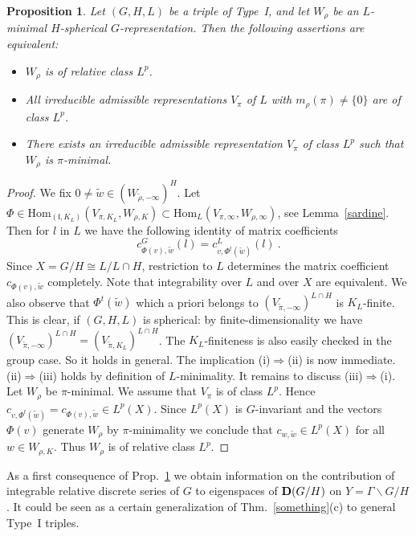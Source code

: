 \documentclass[10]{amsart}
\newtheorem{pro}[thm]{Proposition}
\theoremstyle{remark}
\theoremstyle{definition}
\numberwithin{equation}{section}
\newcommand{\Hom}{\mathrm{Hom}}
\newcommand{\fl}{{\mathfrak l}}
\newcommand{\be}{\begin{equation}}
\begin{document}
{\begin{pro}\label{fishy}
Let $(G,H,L)$ be a triple of Type~I, and let $W_\rho$ be an $L$-minimal  $H$-spherical $G$-representation. Then the following assertions are equivalent:
\begin{itemize}
\item[(i)] $W_\rho$ is of relative class $L^p$.
\item[(ii)] All irreducible admissible representations $V_\pi$ of $L$ with $m_\rho(\pi)\ne \{0\}$ are of class $L^p$.
\item[(iii)] There exists an irreducible admissible representation $V_\pi$ of class $L^p$ such that $W_\rho$ is $\pi$-minimal.
\end{itemize}
\end{pro}

\begin{proof}
We fix $0\ne\tilde w\in (W_{\tilde\rho,-\infty})^H$. Let $\Phi\in  \Hom_{(\fl,K_L)}(V_{\pi,K_L},W_{\rho,K})\subset  \Hom_{L}(V_{\pi,\infty},W_{\rho,\infty})$, see Lemma~\ref{sardine}.
Then for $l$ in $L$ we have the following identity of matrix coefficients
\be\label{dadamax} 
 c^G_{\Phi(v),\tilde w}(l)=c^L_{v,\Phi^t(\tilde w)}(l) \ .
\end{equation}
Since $X=G/H \cong L/L\cap H$, restriction to $L$ determines the matrix coefficient $c_{\Phi(v),\tilde w}$ completely. Note that integrability over $L$ and over $X$
are equivalent. We also observe that $\Phi^t(\tilde w)$ which a priori belongs to  $(V_{\tilde\pi,-\infty})^{L\cap H}$ is $K_L$-finite.
This is clear, if $(G,H,L)$ is spherical: by finite-dimensionality we have $(V_{\tilde\pi,-\infty})^{L\cap H}=(V_{\tilde\pi,K_L})^{L\cap H}$. The $K_L$-finiteness
is also easily checked in the group case. So it holds in general. The implication (i)$\Rightarrow$(ii) is now immediate. (ii)$\Rightarrow$(iii) holds by definition of $L$-minimality.
It remains to discuss (iii)$\Rightarrow$(i). Let $W_\rho$ be $\pi$-minimal. We assume that $V_\pi$ is of class $L^p$. Hence $c_{v,\Phi^t(\tilde w)}=c_{\Phi(v),\tilde w}\in L^p(X)$.
Since $L^p(X)$ is $G$-invariant and the vectors $\Phi(v)$ generate $W_\rho$ by $\pi$-minimality we conclude that $c_{w,\tilde w}\in L^p(X)$ for all $w\in W_{\rho,K}$. 
Thus $W_\rho$ is of relative class $L^p$.
\end{proof}

As a first consequence of Prop.~\ref{fishy}
we obtain information on the contribution of integrable relative discrete series of $G$ to eigenspaces of ${\bf D}(G/H)$ on $Y=\Gamma\backslash G/H$.
It could be seen as a certain generalization of Thm.~\ref{something}(c) to general Type~I triples. 

}
\end{document}
